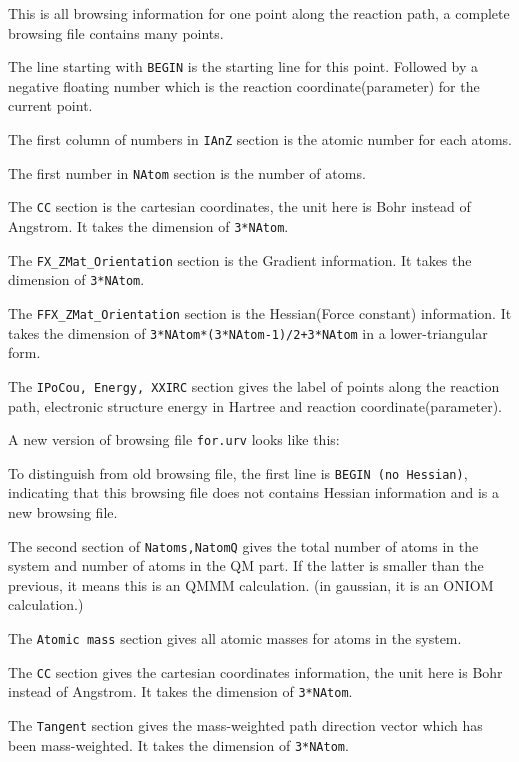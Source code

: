 This is all browsing information for one point along the reaction path, a complete browsing file contains many points. 

\lstset{basicstyle=\ttfamily\footnotesize,breaklines=true}
The line starting with \texttt{BEGIN} is the starting line for this point. Followed by a negative floating number which is the reaction coordinate(parameter) for the current point.

The first column of numbers in \texttt{IAnZ} section is the atomic number for each atoms.

The first number in \texttt{NAtom} section is the number of atoms. 

The  \texttt{CC} section is the cartesian coordinates, the unit here is Bohr instead of Angstrom. It takes the dimension of \texttt{3*NAtom}.

The  \texttt{FX\_ZMat\_Orientation} section is the Gradient information. It takes the dimension of \texttt{3*NAtom}.

The  \texttt{FFX\_ZMat\_Orientation} section is the Hessian(Force constant) information. It takes the dimension of \texttt{3*NAtom*(3*NAtom-1)/2+3*NAtom} in a lower-triangular form.

The  \texttt{IPoCou, Energy, XXIRC} section gives the label of points along the reaction path, electronic structure energy in Hartree and reaction coordinate(parameter).


A new version of browsing file \texttt{for.urv} looks like this:
\lstset{basicstyle=\ttfamily\footnotesize,breaklines=true}


To distinguish from old browsing file, the first line is \texttt{BEGIN (no Hessian)}, indicating that this browsing file does not contains Hessian information and is a new browsing file.

The second section of \texttt{Natoms,NatomQ} gives the total number of atoms in the system and number of atoms in the QM part. If the latter is smaller than the previous, it means this is an QMMM calculation. (in gaussian, it is an ONIOM calculation.)

The \texttt{Atomic mass} section gives all atomic masses for atoms in the system.

The \texttt{CC} section gives the cartesian coordinates information, the unit here is Bohr instead of Angstrom. It takes the dimension of \texttt{3*NAtom}.

The \texttt{Tangent} section gives the mass-weighted path direction vector which has been mass-weighted. It takes the dimension of \texttt{3*NAtom}.

